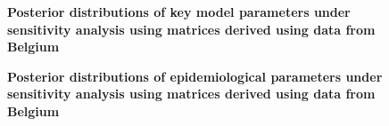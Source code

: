 \begin{figure}[ht]
    \caption{\textbf{Posterior distributions of key model parameters under sensitivity analysis using matrices derived using data from Belgium}}
    \label{fig:belgium_sensitivity_key_params}
\end{figure}

\begin{figure}[ht]
    \caption{\textbf{Posterior distributions of epidemiological parameters under sensitivity analysis using matrices derived using data from Belgium}}
    \label{fig:belgium_sensitivity_epi_params}
\end{figure}

